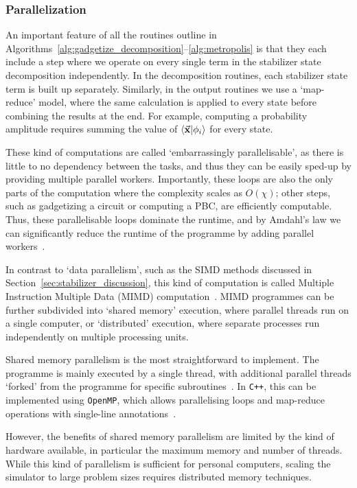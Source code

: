 \subsubsection{Parallelization}
An important feature of all the routines outline in Algorithms~\ref{alg:gadgetize_decomposition}--\ref{alg:metropolis} is that they each include a step where we operate on every single term in the stabilizer state decomposition independently. In the decomposition routines, each stabilizer state term is built up separately. Similarly, in the output routines we use a `map-reduce' model, where the same calculation is applied to every state before combining the results at the end. For example, computing a probability amplitude requires summing the value of $\braket{\va{x}}{\phi_{i}}$ for every state.\par
These kind of computations are called `embarrassingly parallelisable', as there is little to no dependency between the tasks, and thus they can be easily sped-up by providing multiple parallel workers. Importantly, these loops are also the only parts of the computation where the complexity scales as $O(\chi)$; other steps, such as gadgetizing a circuit or computing a PBC, are efficiently computable. Thus, these parallelisable loops dominate the runtime, and by Amdahl's law we can significantly reduce the runtime of the programme by adding parallel workers~\cite{Amdahl1967}.\par
In contrast to `data parallelism', such as the SIMD methods discussed in Section~\ref{sec:stabilizer_discussion}, this kind of computation is called Multiple Instruction Multiple Data (MIMD) computation~\cite{Flynn1972}. MIMD programmes can be further subdivided into `shared memory' execution, where parallel threads run on a single computer, or `distributed' execution, where separate processes run independently on multiple processing units.\par
Shared memory parallelism is the most straightforward to implement. The programme is mainly executed by a single thread, with additional parallel threads `forked' from the programme for specific subroutines~\cite{Kessler2007}. In \texttt{C++}, this can be implemented using \texttt{OpenMP}, which allows parallelising loops and map-reduce operations with single-line annotations~\cite{OpenMP}.\par
However, the benefits of shared memory parallelism are limited by the kind of hardware available, in particular the maximum memory and number of threads. While this kind of parallelism is sufficient for personal computers, scaling the simulator to large problem sizes requires distributed memory techniques.\par
